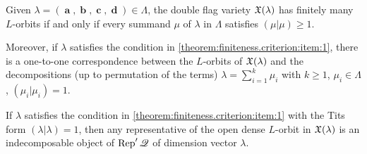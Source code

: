 \documentclass[12pt,reqno]{amsart}
\begin{document}
\begin{theorem}\label{theorem:finiteness.criterion}
\begin{penumerate}
\item\label{theorem:finiteness.criterion:item:1}
Given $ \lambda=(\mbfa,\mbfb,\mbfc,\mbfd)\in\Lambda$, the double flag variety $ \mathfrak{X}(\lambda) $ has finitely many $L$-orbits if and only if every summand $\mu$ of $\lambda$ in $\Lambda$ satisfies $(\mu|\mu)\geq 1$.

\item\label{theorem:finiteness.criterion:item:2}
Moreover, if $ \lambda $ satisfies the condition in \eqref{theorem:finiteness.criterion:item:1}, there is a one-to-one correspondence
between the $L$-orbits of $\mathfrak{X}(\lambda)$
and the decompositions (up to permutation of the terms) $\lambda=\sum_{i=1}^k \mu_i$
with $k\geq 1$, $\mu_i\in\Lambda$, $(\mu_i|\mu_i)=1$.

\item\label{theorem:finiteness.criterion:item:3}
If $ \lambda $ satisfies the condition in \eqref{theorem:finiteness.criterion:item:1}
with the Tits form $(\lambda|\lambda)=1$,
then any representative of the open dense $ L $-orbit in $\mathfrak{X}(\lambda)$
is an indecomposable object
of $\Rep'\quiver$ of dimension vector $\lambda$.
\end{penumerate}
\end{theorem}
\end{document}
